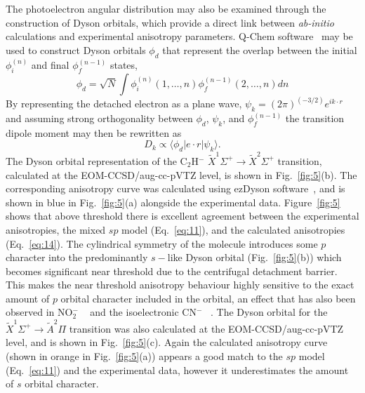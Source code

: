 \documentclass[aip,graphicx]{revtex4-1}
\begin{document}
The photoelectron angular distribution may also be examined through the construction of Dyson orbitals, which provide a direct link between \emph{ab-initio} calculations and experimental anisotropy parameters. Q-Chem software~\cite{sha15} may be used to construct Dyson orbitals $\phi_d$ that represent the overlap between the initial $\phi_i^{(n)}$ and final $\phi_f^{(n-1)}$ states,
\begin{equation}
\phi_d = \sqrt{N}\int\phi_i^{(n)}(1,\dots,n)\phi_f^{(n-1)}(2,\dots,n)dn
\label{eq:13}
\end{equation}
By representing the detached electron as a plane wave, $\psi_k=(2\pi)^{(-3/2)}e^{ik\cdot r}$ and assuming strong orthogonality between $\phi_d$, $\psi_k$, and $\phi_f^{(n-1)}$ the transition dipole moment may then be rewritten as
\begin{equation}
D_k \propto \langle \phi_d | e\cdot r | \psi_k\rangle.
\label{eq:14}
\end{equation}
The Dyson orbital representation of the C$_2$H$^-$ $\tilde{X}^1\Sigma^+\rightarrow\tilde{X}^2\Sigma^+$ transition, calculated at the EOM-CCSD/aug-cc-pVTZ level, is shown in Fig.~\ref{fig:5}(b). The corresponding anisotropy curve was calculated using ezDyson software~\cite{goz22}, and is shown in blue in Fig.~\ref{fig:5}(a) alongside the experimental data. Figure~\ref{fig:5} shows that above threshold there is excellent agreement between the experimental anisotropies, the mixed $sp$ model (Eq.~\ref{eq:11}), and the calculated anisotropies (Eq.~\ref{eq:14}). The cylindrical symmetry of the molecule introduces some $p$ character into the predominantly $s-$like Dyson orbital (Fig.~\ref{fig:5}(b)) which becomes significant near threshold due to the centrifugal detachment barrier. This makes the near threshold anisotropy behaviour highly sensitive to the exact amount of $p$ orbital character included in the orbital, an effect that has also been observed in NO$_2^-$ ~\cite{law19} and the isoelectronic CN$^-$ ~\cite{har21}. The Dyson orbital for the $\tilde{X}^1\Sigma^+\rightarrow\tilde{A} ^2\Pi$ transition was also calculated at the EOM-CCSD/aug-cc-pVTZ level, and is shown in Fig.~\ref{fig:5}(c). Again the calculated anisotropy curve (shown in orange in Fig.~\ref{fig:5}(a)) appears a good match to the $sp$ model (Eq.~\ref{eq:11}) and the experimental data, however it underestimates the amount of $s$ orbital character.
\end{document}
